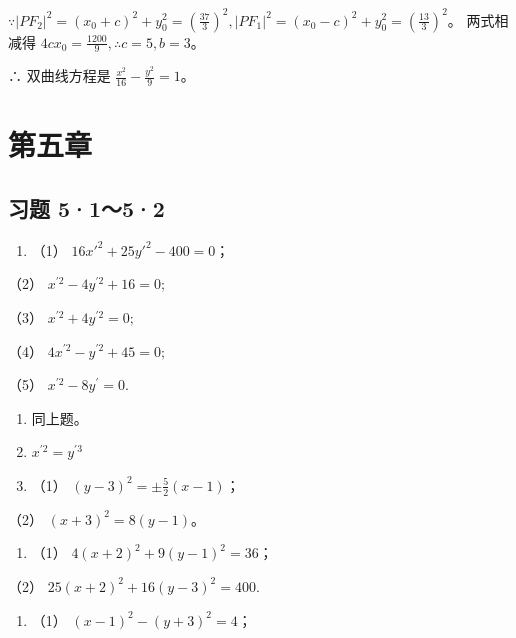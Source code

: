 \(\because |PF_2|^2 = (x_0 + c)^2 + y_0^2 = \left(\frac{37}{3}\right)^2, |PF_1|^2 = (x_0 - c)^2 + y_0^2 = \left(\frac{13}{3}\right)^2\)。
两式相减得 \(4cx_0 = \frac{1200}{9}, \therefore c = 5, b = 3\)。

∴ 双曲线方程是 \(\frac{x^{2}}{16}-\frac{y^{2}}{9}=1\)。

\section{第五章}\label{ux7b2cux4e94ux7ae0}

\subsection{习题 5·1～5·2}\label{ux4e60ux9898-5152}

\begin{enumerate}
\def\labelenumi{\arabic{enumi}.}
\tightlist
\item
  （1） \(16x'^2 + 25y'^2 - 400 = 0\)；
\end{enumerate}

（2） \(x^{\prime 2} - 4y^{\prime 2} + 16 = 0;\)

（3） \(x^{\prime 2} + 4y^{\prime 2} = 0;\)

（4） \(4x^{\prime 2} - y^{\prime 2} + 45 = 0;\)

（5） \(x^{\prime 2} - 8y^{\prime} = 0.\)

\begin{enumerate}
\def\labelenumi{\arabic{enumi}.}
\setcounter{enumi}{1}
\item
  同上题。
\item
  \(x^{\prime 2} = y^{\prime 3}\)
\item
  （1） \((y - 3)^{2} = \pm \frac{5}{2} (x - 1)\)；
\end{enumerate}

（2） \((x + 3)^{2} = 8(y - 1)\)。

\begin{enumerate}
\def\labelenumi{\arabic{enumi}.}
\setcounter{enumi}{4}
\tightlist
\item
  （1） \(4(x + 2)^{2} + 9(y - 1)^{2} = 36\)；
\end{enumerate}

（2） \(25(x + 2)^{2} + 16(y - 3)^{2} = 400.\)

\begin{enumerate}
\def\labelenumi{\arabic{enumi}.}
\setcounter{enumi}{5}
\tightlist
\item
  （1） \((x - 1)^{2} - (y + 3)^{2} = 4\)；
\end{enumerate}

